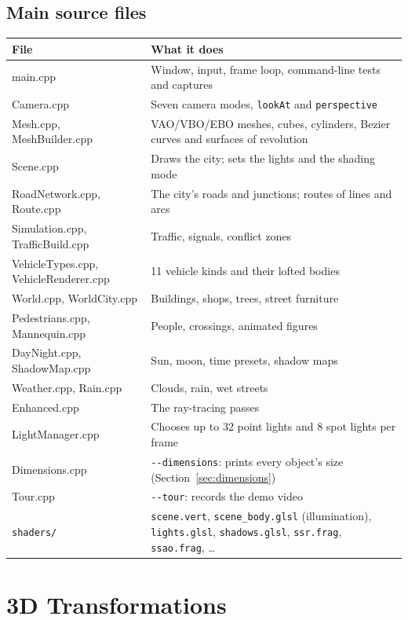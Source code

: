 \documentclass[11pt,a4paper]{article}
\newcommand{\code}[1]{\texttt{\small #1}}
\begin{document}
\subsection{Main source files}
\begin{tabularx}{\textwidth}{@{}>{\ttfamily\small}l X@{}}
\toprule
\normalfont\bfseries File & \bfseries What it does \\ \midrule
main.cpp & Window, input, frame loop, command-line tests and captures \\
Camera.cpp & Seven camera modes, \code{lookAt} and \code{perspective} \\
Mesh.cpp, MeshBuilder.cpp & VAO/VBO/EBO meshes, cubes, cylinders, Bezier curves and surfaces of revolution \\
Scene.cpp & Draws the city; sets the lights and the shading mode \\
RoadNetwork.cpp, Route.cpp & The city's roads and junctions; routes of lines and arcs \\
Simulation.cpp, TrafficBuild.cpp & Traffic, signals, conflict zones \\
VehicleTypes.cpp, VehicleRenderer.cpp & 11 vehicle kinds and their lofted bodies \\
World.cpp, WorldCity.cpp & Buildings, shops, trees, street furniture \\
Pedestrians.cpp, Mannequin.cpp & People, crossings, animated figures \\
DayNight.cpp, ShadowMap.cpp & Sun, moon, time presets, shadow maps \\
Weather.cpp, Rain.cpp & Clouds, rain, wet streets \\
Enhanced.cpp & The ray-tracing passes \\
LightManager.cpp & Chooses up to 32 point lights and 8 spot lights per frame \\
Dimensions.cpp & \code{-{}-dimensions}: prints every object's size (Section~\ref{sec:dimensions}) \\
Tour.cpp & \code{-{}-tour}: records the demo video \\
\code{shaders/} & \code{scene.vert}, \code{scene\_body.glsl} (illumination), \code{lights.glsl}, \code{shadows.glsl}, \code{ssr.frag}, \code{ssao.frag}, \dots \\
\bottomrule
\end{tabularx}

\section{3D Transformations}
\end{document}
